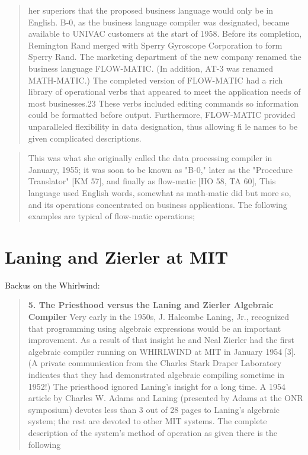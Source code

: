 \begin{quotation}
  her superiors that the proposed business language would only be in English.
  B-0, as the business language compiler was designated, became available to
  UNIVAC customers at the start of 1958. Before its completion, Remington Rand
  merged with Sperry Gyroscope Corporation to form Sperry Rand. The marketing
  department of the new company renamed the business language FLOW-MATIC. (In
  addition, AT-3 was renamed MATH-MATIC.) The completed version of
  FLOW-MATIC had
  a rich library of operational verbs that appeared to meet the application
  needs of most businesses.23 These verbs included editing commands so
  information could be formatted before output. Furthermore,
  FLOW-MATIC provided
  unparalleled flexibility in data designation, thus allowing fi le names to be
  given complicated descriptions.
\end{quotation}

\begin{quotation}
  This was what she originally called the data processing compiler in January,
  1955; it was soon to be known as "B-0," later as the "Procedure
  Translator" [KM 57], and finally as flow-matic [HO 58, TA 60], This language used English
  words, somewhat as math-matic did but more so, and its operations concentrated
  on business applications. The following examples are typical of flow-matic
  operations;
  \cite{history_of_computing_in_the_twentieth_century_1980}
\end{quotation}

\section{Laning and Zierler at MIT}
\label{sec:laning-zierler}


Backus on the Whirlwind\cite{Backus_1980_Programming_in_America_in_1950s}:
\begin{quotation}
  \textbf{5. The Priesthood versus the Laning and Zierler Algebraic Compiler}
  Very early in the 1950s, J. Halcombe Laning, Jr., recognized that
  programming using algebraic expressions would be an important improvement.
  As a result of that insight he and Neal Zierler had the first
  algebraic compiler
  running on WHIRLWIND at MIT in January 1954 [3]. (A private
    communication from the Charles Stark Draper Laboratory indicates
    that they had
  demonstrated algebraic compiling sometime in 1952!) The priesthood
  ignored Laning's insight for a long time. A 1954 article by Charles W. Adams
  and Laning (presented by Adams at the ONR symposium) devotes less than
  3 out of 28 pages to Laning's algebraic system; the rest are devoted to other
  MIT systems. The complete description of the system's method of operation
  as given there is the following
\end{quotation}

